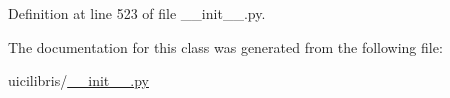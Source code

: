\-Definition at line 523 of file \-\_\-\-\_\-init\-\_\-\-\_\-.\-py.



\-The documentation for this class was generated from the following file\-:\begin{DoxyCompactItemize}
\item 
uicilibris/\hyperlink{____init_____8py}{\-\_\-\-\_\-init\-\_\-\-\_\-.\-py}\end{DoxyCompactItemize}
